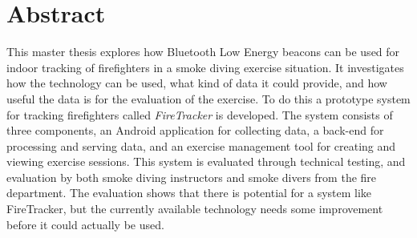 \documentclass[../Main/thesis.tex]{subfiles}
\begin{document}
\null\vfill
{}
\chapter*{Abstract}
This master thesis explores how Bluetooth Low Energy beacons can be used for indoor tracking of firefighters in a smoke diving exercise situation.
It investigates how the technology can be used, what kind of data it could provide, and how useful the data is for the evaluation of the exercise.
To do this a prototype system for tracking firefighters called \textit{FireTracker} is developed.
The system consists of three components, an Android application for collecting data, a back-end for processing and serving data, and an exercise management tool for creating and viewing exercise sessions.
This system is evaluated through technical testing, and evaluation by both smoke diving instructors and smoke divers from the fire department.
The evaluation shows that there is potential for a system like FireTracker, but the currently available technology needs some improvement before it could actually be used.

\vfill\vfill
\clearpage
\blankpage
\end{document}
